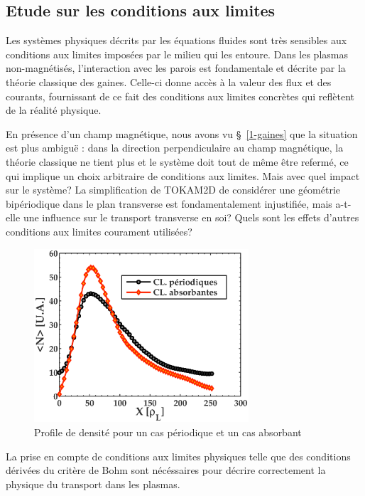 \begin{refsection}
\subsection{Etude sur les conditions aux limites}
	
	Les systèmes physiques décrits par les équations fluides sont très sensibles
	aux conditions aux limites imposées par le milieu qui les entoure. Dans les
	plasmas non-magnétisés, l'interaction avec
	les parois est fondamentale et décrite par la théorie classique des gaines.
	Celle-ci donne accès à la valeur des flux et des courants, fournissant de ce fait des conditions aux
	limites concrètes qui reflètent de la réalité physique.
	
	En présence d'un champ magnétique, nous avons vu §~\ref{1-gaines} que la
	situation est plus ambiguë : dans la direction perpendiculaire au champ
	magnétique, la théorie classique ne tient plus et le système doit
	tout de même être refermé, ce qui implique un choix arbitraire de conditions
	aux limites. Mais avec quel impact sur le système? La simplification de TOKAM2D de considérer une géométrie bipériodique
	dans le plan transverse est fondamentalement injustifiée, mais a-t-elle une
	influence sur le transport transverse en soi? Quels sont les effets d'autres
	conditions aux limites courament utilisées?
	
	\begin{figure}[htbp]
\centering
    \includegraphics[width=8cm]{figures/2-profileDenNoLimit.eps}
    \caption{Profile de densité pour un cas périodique et un cas
    absorbant\label{2-profileDenNoLimit}}
\end{figure}
\footnotemark{}
	
	La prise en compte de conditions aux limites physiques telle que des conditions dérivées du critère de Bohm 
	sont nécéssaires pour décrire correctement la physique du transport dans les plasmas. 
	

\end{refsection}
